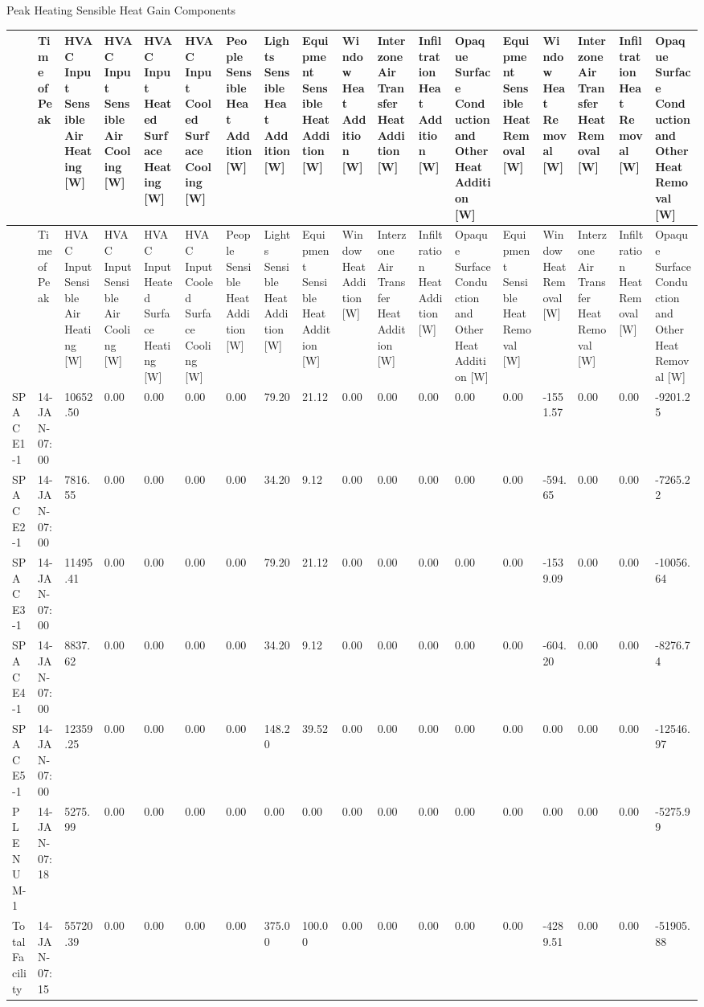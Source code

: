 Peak Heating Sensible Heat Gain Components

{\tiny
\begin{longtable}[c]{>{\raggedright}p{0.28in}>{\raggedright}p{0.28in}>{\raggedright}p{0.28in}>{\raggedright}p{0.28in}>{\raggedright}p{0.28in}>{\raggedright}p{0.28in}>{\raggedright}p{0.28in}>{\raggedright}p{0.28in}>{\raggedright}p{0.28in}>{\raggedright}p{0.28in}>{\raggedright}p{0.28in}>{\raggedright}p{0.28in}>{\raggedright}p{0.28in}>{\raggedright}p{0.28in}>{\raggedright}p{0.28in}>{\raggedright}p{0.28in}>{\raggedright}p{0.28in}>{\raggedright}p{0.28in}}
\toprule 
 & Time of Peak & HVAC Input Sensible Air Heating [W] & HVAC Input Sensible Air Cooling [W] & HVAC Input Heated Surface Heating [W] & HVAC Input Cooled Surface Cooling [W] & People Sensible Heat Addition [W] & Lights Sensible Heat Addition [W] & Equipment Sensible Heat Addition [W] & Window Heat Addition [W] & Interzone Air Transfer Heat Addition [W] & Infiltration Heat Addition [W] & Opaque Surface Conduction and Other Heat Addition [W] & Equipment Sensible Heat Removal [W] & Window Heat Removal [W] & Interzone Air Transfer Heat Removal [W] & Infiltration Heat Removal [W] & Opaque Surface Conduction and Other Heat Removal [W] \tabularnewline
\midrule
\endfirsthead

\toprule 
 & Time of Peak & HVAC Input Sensible Air Heating [W] & HVAC Input Sensible Air Cooling [W] & HVAC Input Heated Surface Heating [W] & HVAC Input Cooled Surface Cooling [W] & People Sensible Heat Addition [W] & Lights Sensible Heat Addition [W] & Equipment Sensible Heat Addition [W] & Window Heat Addition [W] & Interzone Air Transfer Heat Addition [W] & Infiltration Heat Addition [W] & Opaque Surface Conduction and Other Heat Addition [W] & Equipment Sensible Heat Removal [W] & Window Heat Removal [W] & Interzone Air Transfer Heat Removal [W] & Infiltration Heat Removal [W] & Opaque Surface Conduction and Other Heat Removal [W] \tabularnewline
\midrule
\endhead

SPACE1-1 & 14-JAN-07:00 & 10652.50 & 0.00 & 0.00 & 0.00 & 0.00 & 79.20 & 21.12 & 0.00 & 0.00 & 0.00 & 0.00 & 0.00 & -1551.57 & 0.00 & 0.00 & -9201.25 \tabularnewline
SPACE2-1 & 14-JAN-07:00 & 7816.55 & 0.00 & 0.00 & 0.00 & 0.00 & 34.20 & 9.12 & 0.00 & 0.00 & 0.00 & 0.00 & 0.00 & -594.65 & 0.00 & 0.00 & -7265.22 \tabularnewline
SPACE3-1 & 14-JAN-07:00 & 11495.41 & 0.00 & 0.00 & 0.00 & 0.00 & 79.20 & 21.12 & 0.00 & 0.00 & 0.00 & 0.00 & 0.00 & -1539.09 & 0.00 & 0.00 & -10056.64 \tabularnewline
SPACE4-1 & 14-JAN-07:00 & 8837.62 & 0.00 & 0.00 & 0.00 & 0.00 & 34.20 & 9.12 & 0.00 & 0.00 & 0.00 & 0.00 & 0.00 & -604.20 & 0.00 & 0.00 & -8276.74 \tabularnewline
SPACE5-1 & 14-JAN-07:00 & 12359.25 & 0.00 & 0.00 & 0.00 & 0.00 & 148.20 & 39.52 & 0.00 & 0.00 & 0.00 & 0.00 & 0.00 & 0.00 & 0.00 & 0.00 & -12546.97 \tabularnewline
PLENUM-1 & 14-JAN-07:18 & 5275.99 & 0.00 & 0.00 & 0.00 & 0.00 & 0.00 & 0.00 & 0.00 & 0.00 & 0.00 & 0.00 & 0.00 & 0.00 & 0.00 & 0.00 & -5275.99 \tabularnewline
Total Facility & 14-JAN-07:15 & 55720.39 & 0.00 & 0.00 & 0.00 & 0.00 & 375.00 & 100.00 & 0.00 & 0.00 & 0.00 & 0.00 & 0.00 & -4289.51 & 0.00 & 0.00 & -51905.88 \tabularnewline
\bottomrule
\end{longtable}}

